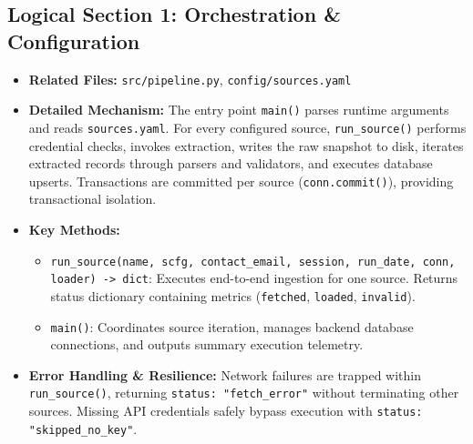 \documentclass[10pt,letterpaper]{article}
\begin{document}
\subsection{Logical Section 1: Orchestration \& Configuration}
\begin{itemize}[leftmargin=1.5em]
    \item \textbf{Related Files:} \texttt{src/pipeline.py}, \texttt{config/sources.yaml}
    \item \textbf{Detailed Mechanism:} The entry point \texttt{main()} parses runtime arguments and reads \texttt{sources.yaml}. For every configured source, \texttt{run\_source()} performs credential checks, invokes extraction, writes the raw snapshot to disk, iterates extracted records through parsers and validators, and executes database upserts. Transactions are committed per source (\texttt{conn.commit()}), providing transactional isolation.
    \item \textbf{Key Methods:}
    \begin{itemize}
        \item \texttt{run\_source(name, scfg, contact\_email, session, run\_date, conn, loader) -> dict}: Executes end-to-end ingestion for one source. Returns status dictionary containing metrics (\texttt{fetched}, \texttt{loaded}, \texttt{invalid}).
        \item \texttt{main()}: Coordinates source iteration, manages backend database connections, and outputs summary execution telemetry.
    \end{itemize}
    \item \textbf{Error Handling \& Resilience:} Network failures are trapped within \texttt{run\_source()}, returning \texttt{status: "fetch\_error"} without terminating other sources. Missing API credentials safely bypass execution with \texttt{status: "skipped\_no\_key"}.
\end{itemize}
\end{document}
